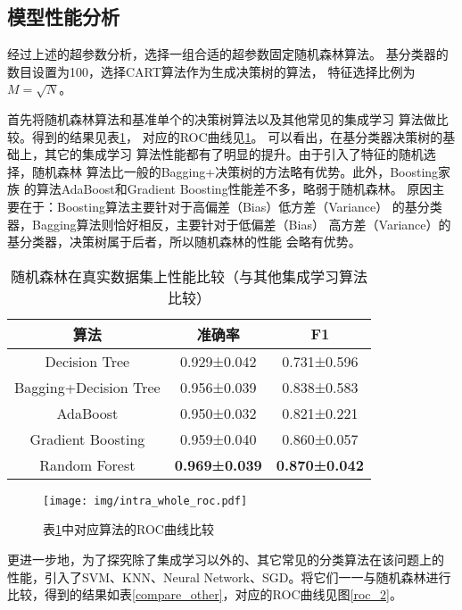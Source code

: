 \documentclass[main.tex]{subfiles}
\begin{document}
\subsection{模型性能分析}


经过上述的超参数分析，选择一组合适的超参数固定随机森林算法。
基分类器的数目设置为100，选择CART算法作为生成决策树的算法，
特征选择比例为$M=\sqrt{N}$。

首先将随机森林算法和基准单个的决策树算法以及其他常见的集成学习
算法做比较。得到的结果见表\ref{compare_ensemble}，
对应的ROC曲线见\ref{roc_1}。
可以看出，在基分类器决策树的基础上，其它的集成学习
算法性能都有了明显的提升。由于引入了特征的随机选择，随机森林
算法比一般的Bagging+决策树的方法略有优势。此外，Boosting家族
的算法AdaBoost和Gradient Boosting性能差不多，略弱于随机森林。
原因主要在于：Boosting算法主要针对于高偏差（Bias）低方差（Variance）
的基分类器，Bagging算法则恰好相反，主要针对于低偏差（Bias）
高方差（Variance）的基分类器，决策树属于后者，所以随机森林的性能
会略有优势。

\begin{table}[]
    \caption{随机森林在真实数据集上性能比较（与其他集成学习算法比较）}
    \label{compare_ensemble}
    \centering
    \begin{tabular}{ccc}
    \hline
    算法                    & 准确率                  & F1          \\ \hline
    Decision Tree         & 0.929±0.042          & 0.731±0.596 \\ 
    Bagging+Decision Tree & 0.956±0.039          & 0.838±0.583 \\
    AdaBoost              & 0.950±0.032          & 0.821±0.221 \\
    Gradient Boosting     & 0.959±0.040          & 0.860±0.057 \\ \hline
    Random Forest         & \textbf{0.969±0.039} & \textbf{0.870±0.042} \\ \hline
    \end{tabular}
\end{table}

\begin{figure}[htbp!]
    \centering \texttt{[image: img/intra\_whole\_roc.pdf]} 
    \caption{表\ref{compare_ensemble}中对应算法的ROC曲线比较}
    \label{roc_1}
\end{figure}

更进一步地，为了探究除了集成学习以外的、其它常见的分类算法在该问题上的
性能，引入了SVM、KNN、Neural Network、SGD。将它们一一与随机森林进行
比较，得到的结果如表\ref{compare_other}，对应的ROC曲线见图\ref{roc_2}。
\end{document}
